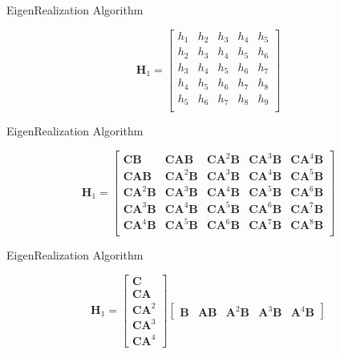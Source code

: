 \documentclass[aspectratio=169, usenames, dvipsnames]{beamer}
\begin{document}
\begin{frame}{EigenRealization Algorithm}
  \vfill

  \Large
  \[
  \bm{H}_1
  =
  \begin{bmatrix}
    h_1 & h_2 & h_3 & h_4 & h_5 \\
    h_2 & h_3 & h_4 & h_5 & h_6 \\
    h_3 & h_4 & h_5 & h_6 & h_7 \\
    h_4 & h_5 & h_6 & h_7 & h_8 \\
    h_5 & h_6 & h_7 & h_8 & h_9 \\
  \end{bmatrix}
  \]

  \vfill
\end{frame}

\begin{frame}{EigenRealization Algorithm}
  \vfill

  \Large
  \[
  \bm{H}_1
  =
  \begin{bmatrix}
    \bm{CB} & \bm{CAB} & \bm{CA}^2 \bm{B} & \bm{CA}^3 \bm{B} & \bm{CA}^4 \bm{B} \\
    \bm{CAB} & \bm{CA}^2 \bm{B} & \bm{CA}^3 \bm{B} & \bm{CA}^4 \bm{B} & \bm{CA}^5 \bm{B} \\
    \bm{CA}^2 \bm{B} & \bm{CA}^3 \bm{B} & \bm{CA}^4 \bm{B} & \bm{CA}^5 \bm{B} & \bm{CA}^6 \bm{B} \\
    \bm{CA}^3 \bm{B} & \bm{CA}^4 \bm{B} & \bm{CA}^5 \bm{B} & \bm{CA}^6 \bm{B} & \bm{CA}^7 \bm{B} \\
    \bm{CA}^4 \bm{B} & \bm{CA}^5 \bm{B} & \bm{CA}^6 \bm{B} & \bm{CA}^7 \bm{B} & \bm{CA}^8 \bm{B} \\
  \end{bmatrix}
  \]

  \vfill
\end{frame}


\begin{frame}{EigenRealization Algorithm}
  \vfill

  \Large
  \[
  \bm{H}_1
  =
  \begin{bmatrix}
    \bm{C} \\ \bm{CA} \\ \bm{CA}^2 \\ \bm{CA}^3 \\ \bm{CA}^4
  \end{bmatrix}
  \begin{bmatrix}
    \bm{B} & \bm{AB} & \bm{A}^2 \bm{B} & \bm{A}^3 \bm{B} & \bm{A}^4 \bm{B}
  \end{bmatrix}
  \]

  \vfill
\end{frame}
\end{document}
